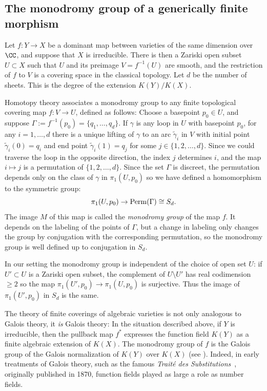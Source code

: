 \subsection{The monodromy group of a generically finite morphism}

Let $f : Y \to X$ be a dominant map between varieties of the same dimension over $\CC$, and suppose that $X$ is irreducible. There is then a Zariski open subset $U \subset X$ such that $U$ and 
its preimage $V = f^{-1}(U)$ are smooth, and the restriction of $f$ to $V$ is a covering space in the classical topology. Let $d$ be the number of sheets. This is the degree of the extension $K(Y)/K(X)$. %

Homotopy theory  associates a monodromy group to any finite topological covering map $f : V \to U$, defined as follows: Choose a basepoint $p_0 \in U$, and suppose $\Gamma := f^{-1}(p_0)  = \{q_1,\dots,q_d\}$. If $\gamma$ is any loop in $U$ with basepoint $p_0$, for any $i = 1, \dots, d$ there is a unique lifting of $\gamma$ to an arc $\tilde \gamma_i$ in $V$ with initial point $\tilde \gamma_i(0) = q_i$ and end point $\tilde \gamma_i(1) = q_j$ for some $j \in \{1,2,\dots,d\}$. Since we could traverse the loop in the opposite direction, the index $j$ determines $i$, and the map $i\mapsto j$ is a permutation of $\{1,2,\dots,d\}$. 
Since the set $\Gamma$ is discreet, the permutation depends only on the class of $\gamma$ in $\pi_1(U,p_0)$ so we have defined a homomorphism to the symmetric group:
$$
\pi_1(U,p_0)  \to {\rm Perm}(\Gamma) \cong S_d.
$$
The image $M$ of this map is called the \emph{monodromy group} of the map $f$. It depends on the labeling of the points of $\Gamma$, but a change in labeling
only changes the group by conjugation with the corresponding permutation, so the monodromy group is well defined up to 
conjugation in $S_{d}$.

\begin{fact}\label{Galois equals monodromy}
In our setting  the monodromy group is independent of the choice of open set $U$: if $U' \subset U$ is a Zariski open subset, the complement of $U\setminus U'$ has
real codimension $\geq 2$ so the map $\pi_1(U', p_0) \to \pi_1(U,p_0)$ is surjective. Thus the image of $\pi_1(U', p_0)$ in $S_d$ is the same. 

The theory of finite coverings of algebraic varieties is not only analogous to Galois theory, it \emph{is} Galois theory: In the situation described above, if $Y$ is irreducible, then the pullback map $f^*$ expresses the function field $K(Y)$ as a finite algebraic extension of $K(X)$. The monodromy group of $f$  is the Galois group of the Galois normalization of $K(Y)$ over $K(X)$ (see \cite{Harris1979}). Indeed, in early treatments of Galois theory, such as the famous \emph{Trait\'e des Substitutions}~\cite{MR1188877}, originally published in 1870, function fields played as large a role as number fields.
\end{fact}

